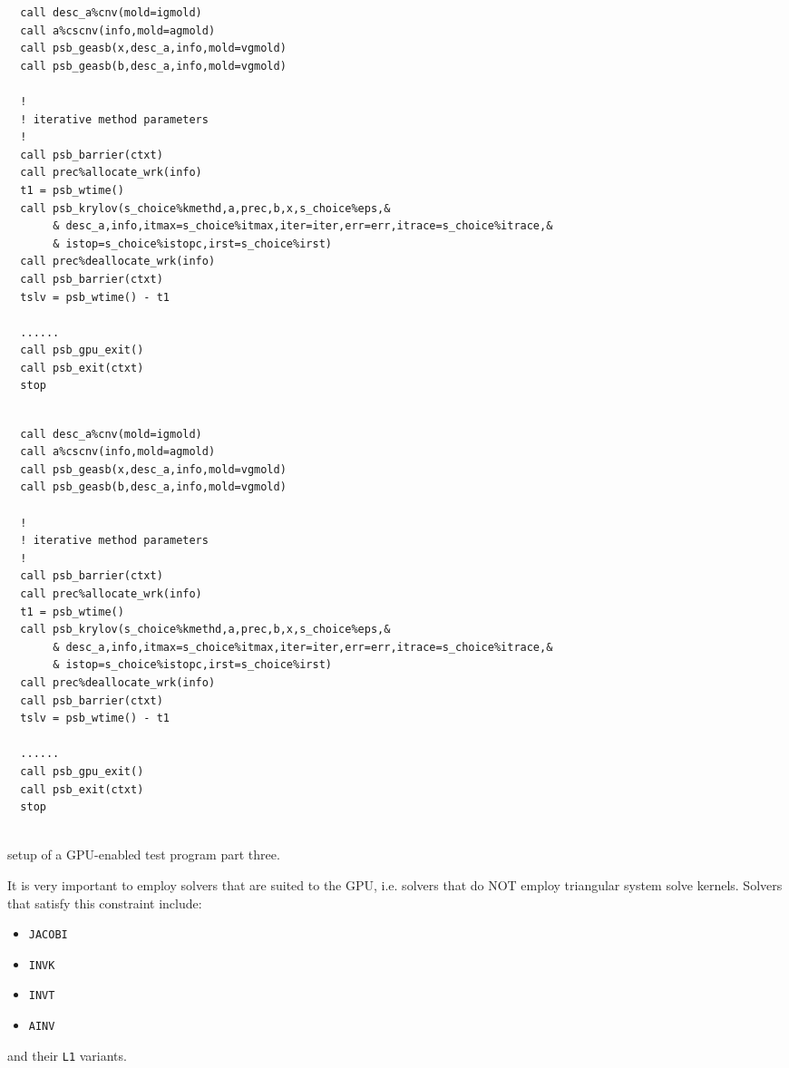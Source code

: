 \begin{listing}[h!]
\ifpdf
\begin{verbatim}
  call desc_a%cnv(mold=igmold)
  call a%cscnv(info,mold=agmold)
  call psb_geasb(x,desc_a,info,mold=vgmold)
  call psb_geasb(b,desc_a,info,mold=vgmold)

  !
  ! iterative method parameters
  !
  call psb_barrier(ctxt)
  call prec%allocate_wrk(info)
  t1 = psb_wtime()
  call psb_krylov(s_choice%kmethd,a,prec,b,x,s_choice%eps,&
       & desc_a,info,itmax=s_choice%itmax,iter=iter,err=err,itrace=s_choice%itrace,&
       & istop=s_choice%istopc,irst=s_choice%irst)
  call prec%deallocate_wrk(info)
  call psb_barrier(ctxt)
  tslv = psb_wtime() - t1

  ......
  call psb_gpu_exit()
  call psb_exit(ctxt)
  stop
  

\end{verbatim}
\else
\begin{center}
\begin{minipage}{.90\textwidth}
{\small
\begin{verbatim}
  call desc_a%cnv(mold=igmold)
  call a%cscnv(info,mold=agmold)
  call psb_geasb(x,desc_a,info,mold=vgmold)
  call psb_geasb(b,desc_a,info,mold=vgmold)

  !
  ! iterative method parameters
  !
  call psb_barrier(ctxt)
  call prec%allocate_wrk(info)
  t1 = psb_wtime()
  call psb_krylov(s_choice%kmethd,a,prec,b,x,s_choice%eps,&
       & desc_a,info,itmax=s_choice%itmax,iter=iter,err=err,itrace=s_choice%itrace,&
       & istop=s_choice%istopc,irst=s_choice%irst)
  call prec%deallocate_wrk(info)
  call psb_barrier(ctxt)
  tslv = psb_wtime() - t1

  ......
  call psb_gpu_exit()
  call psb_exit(ctxt)
  stop
  
 \end{verbatim}
}
\end{minipage}
\end{center}
\fi
\caption{setup of a GPU-enabled test program part three.\label{fig:gpu-ex3}}
\end{listing}

It is very important to employ solvers that are suited
to the GPU, i.e.  solvers that do NOT  employ triangular
system solve kernels.  Solvers that satisfy this constraint include:
\begin{itemize}
\item \verb|JACOBI|
\item \verb|INVK|
\item \verb|INVT|
\item \verb|AINV|
\end{itemize}
and their \verb|L1| variants. 

